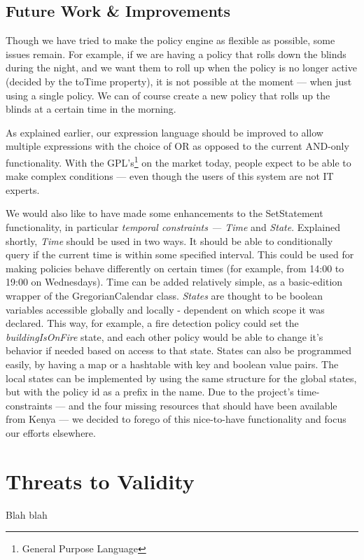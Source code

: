 \subsection{Future Work \& Improvements}\label{subsec:improvements}
Though we have tried to make the policy engine as flexible as possible, some issues remain. For example, if we are having a policy that rolls down the blinds during the night, and we want them to roll up when the policy is no longer active (decided by the toTime property), it is not possible at the moment --- when just using a single policy. We can of course create a new policy that rolls up the blinds at a certain time in the morning.

As explained earlier, our expression language should be improved to allow multiple expressions with the choice of OR as opposed to the current AND-only functionality. With the GPL's\footnote{General Purpose Language} on the market today, people expect to be able to make complex conditions --- even though the users of this system are not IT experts. 

We would also like to have made some enhancements to the SetStatement functionality, in particular \textit{temporal constraints --- Time} and \textit{State}. Explained shortly, \textit{Time} should be used in two ways. It should be able to conditionally query if the current time is within some specified interval. This could be used for making policies behave differently on certain times (for example, from 14:00 to 19:00 on Wednesdays). Time can be added relatively simple, as a basic-edition wrapper of the GregorianCalendar class. \textit{States} are thought to be boolean variables accessible globally and locally - dependent on which scope it was declared. This way, for example, a fire detection policy could set the \textit{buildingIsOnFire} state, and each other policy would be able to change it's behavior if needed based on access to that state. States can also be programmed easily, by having a map or a hashtable with key and boolean value pairs. The local states can be implemented by using the same structure for the global states, but with the policy id as a prefix in the name. Due to the project's time-constraints --- and the four missing resources that should have been available from Kenya --- we decided to forego of this nice-to-have functionality and focus our efforts elsewhere. 

\section{Threats to Validity}\label{subsec:threatstovalidity}
Blah blah